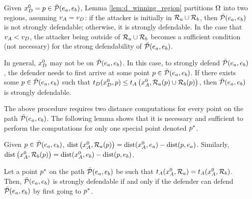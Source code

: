 Given $x_D^0=p\in\bar{\mathcal{P}}(e_a,e_b)$, Lemma \ref{lem:d_winning_region} partitions $\Omega$ into two regions, assuming $v_A=v_D$: if the attacker is initially in $\mathcal{R}_a \cup \mathcal{R}_b$, then $\bar{\mathcal{P}}(e_a,e_b)$ is not strongly defendable; otherwise, it is strongly defendable. In the case that $v_A<v_D$, the attacker being outside of $\mathcal{R}_a \cup \mathcal{R}_b$ becomes a sufficient condition (not necessary) for the strong defendability of $\bar{\mathcal{P}}(e_a,e_b)$.

In general, $x_D^0$ may not be on $\bar{\mathcal{P}}(e_a,e_b)$. In this case, to strongly defend $\bar{\mathcal{P}}(e_a,e_b)$, the defender needs to first arrive at some point $p\in\bar{\mathcal{P}}(e_a,e_b)$. If there exists some $p\in\bar{\mathcal{P}}(e_a,e_b)$ such that $t_D(x_D^0, p)\le t_A\left(x_A^0,\mathcal{R}_a(p)\cup\mathcal{R}_b(p)\right)$, then $\bar{\mathcal{P}}(e_a,e_b)$ is strongly defendable. %

%


The above procedure requires two distance computations for every point on the path $\bar{\mathcal{P}}(e_a,e_b)$. The following lemma shows that it is necessary and sufficient to perform the computations for only one special point denoted $p^*$.

\begin{rem} \label{rem:time_to_region_a}
Given $p\in\bar{\mathcal{P}}(e_a,e_b)$, $\text{dist}\left(x_A^0,\mathcal{R}_a(p)\right) = \text{dist}(x_A^0,e_a) - \text{dist}(p,e_a)$. Similarly, $\text{dist}\left(x_A^0,\mathcal{R}_b(p)\right) = \text{dist}(x_A^0,e_b) - \text{dist}(p,e_b)$.
\end{rem}

\begin{lem} \label{lem:pstar}
Let a point $p^*$ on the path $\bar{\mathcal{P}}(e_a,e_b)$ be such that $t_A(x_A^0,\mathcal{R}_a)=t_A(x_A^0,\mathcal{R}_b)$. Then, $\bar{\mathcal{P}}(e_a,e_b)$ is strongly defendable if and only if the defender can defend $\bar{\mathcal{P}}(e_a,e_b)$ by first going to $p^*$.
\end{lem}

